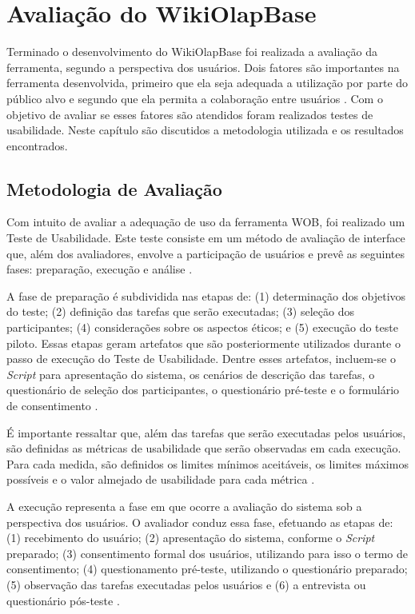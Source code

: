 \chapter{Avaliação do WikiOlapBase}
\label{chap:avaliacao}

Terminado o desenvolvimento do WikiOlapBase foi realizada a avaliação da ferramenta, segundo
a perspectiva dos usuários. Dois fatores são importantes na ferramenta desenvolvida, primeiro 
que ela seja adequada a utilização por parte do público alvo e segundo que ela permita a 
colaboração entre usuários \cite{barbosa2010}. Com o objetivo de avaliar se esses 
fatores são atendidos foram realizados testes de usabilidade. Neste capítulo são discutidos a 
metodologia utilizada e os resultados encontrados.

\section{Metodologia de Avaliação}
\label{sec:metodologia-avaliacao}

Com intuito de avaliar a adequação de uso da ferramenta WOB, foi realizado um Teste de 
Usabilidade. Este teste consiste em um método de avaliação de interface que, além dos 
avaliadores, envolve a participação de usuários e prevê as seguintes fases: preparação, 
execução e análise \cite{barbosa2010}.

A fase de preparação é subdividida nas etapas de: (1) determinação dos objetivos do teste; 
(2) definição das tarefas que serão executadas; (3) seleção dos participantes; (4) 
considerações sobre os aspectos éticos; e (5) execução do teste piloto. Essas etapas geram 
artefatos que são posteriormente utilizados durante o passo de execução do Teste de 
Usabilidade. Dentre esses artefatos, incluem-se o \textit{Script} para apresentação do sistema, 
os  cenários de descrição das tarefas, o questionário de seleção dos participantes, o 
questionário pré-teste e o formulário de consentimento \cite{barbosa2010}.

É importante ressaltar que, além das tarefas que serão executadas pelos usuários, são 
definidas as métricas de usabilidade que serão observadas em cada execução. Para cada 
medida, são definidos os limites mínimos aceitáveis, os limites máximos possíveis e o 
valor almejado de usabilidade para cada métrica \cite{barbosa2010}.

A execução representa a fase em que ocorre a avaliação do sistema sob a perspectiva dos 
usuários. O avaliador conduz essa fase, efetuando as etapas de: (1) recebimento do usuário; 
(2) apresentação do sistema, conforme o \textit{Script} preparado; (3) consentimento formal 
dos usuários, utilizando para isso o termo de consentimento; (4) questionamento pré-teste, 
utilizando o questionário preparado; (5) observação das tarefas executadas pelos usuários e 
(6) a entrevista ou questionário pós-teste \cite{barbosa2010}.

